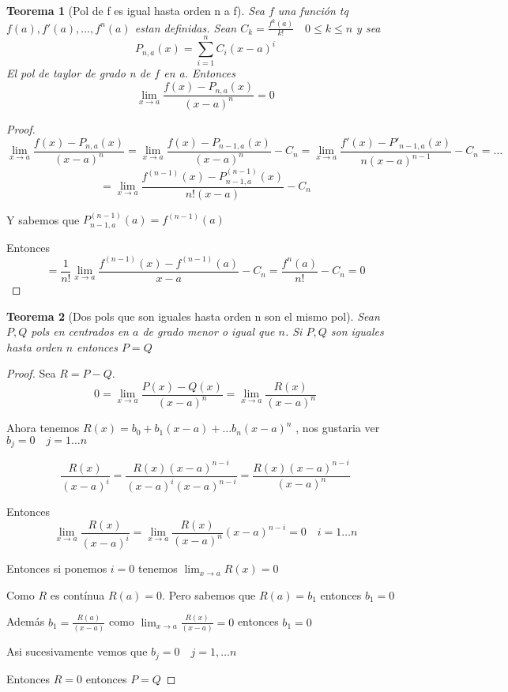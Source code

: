 \documentclass{article}
\theoremstyle{break}
\newtheorem{theorem}{Teorema}[section]
\begin{document}
\begin{theorem}[Pol de f es igual hasta orden n a f]
	Sea $f$ una función tq $f(a),f'(a),\ldots,f^n(a)$ estan definidas. 
	Sean $C_k = \frac{f^k(a)}{k!} \quad 0\leq k\leq n$	y sea 
	\[P_{n,a}(x)= \sum_{i=1}^{n} C_i(x-a)^i\]
	El pol de taylor de grado n de $f$ en a. Entonces 
	\[ \lim_{x \rightarrow a }\frac{f(x)-P_{n,a}(x)}{(x-a)^n}=0 \]
\end{theorem}
\begin{proof}
		\[ \lim_{x \rightarrow a }\frac{f(x)-P_{n,a}(x)}{(x-a)^n}= 
		\lim_{x \rightarrow a }\frac{f(x)-P_{n-1,a}(x)}{(x-a)^n} -C_n = 
		\lim_{x \rightarrow a }\frac{f'(x)-P'_{n-1,a}(x)}{n(x-a)^{n-1}} -C_n= \ldots\]
		\[ =
		 \lim_{x \rightarrow a }\frac{f^{(n-1)}(x)-P^{(n-1)}_{n-1,a}(x)}{n!(x-a)} -C_n\]

		Y sabemos que $P_{n-1,a}^{(n-1)}(a) = f^{(n-1)}(a)$

		Entonces \[ = \frac{1}{n!}\lim_{x \rightarrow a }\frac{f^{(n-1)}(x)-f^{(n-1)}(a)}{x-a} 
		-C_n = \frac{f^n(a)}{n!} - C_n = 0\]
\end{proof}

\begin{theorem}[Dos pols que son iguales hasta orden n son el mismo pol]
	Sean $P,Q$ pols en centrados en $a$ de grado menor o igual que $n$. Si $P,Q$ son iguales
	hasta orden $n$ entonces $P=Q$
\end{theorem}
\begin{proof}
	Sea $R = P - Q$.
	\[ 0 = \lim_{x \rightarrow a }\frac{P(x)-Q(x)}{(x-a)^n} = \lim_{x \rightarrow a }\frac{R(x)}{(x-a)^n} \]

	Ahora tenemos $R(x) = b_0 + b_1 (x-a) + \ldots b_n(x-a)^n$ , 
	nos gustaria ver $b_j = 0 \quad j=1\ldots n$

	\[ \frac{R(x)}{(x-a)^i} = \frac{R(x)(x-a)^{n-i}}{(x-a)^i(x-a)^{n-i}} 
	= \frac{R(x)(x-a)^{n-i}}{(x-a)^n} \]

	Entonces \[ \lim_{x \rightarrow a } \frac{R(x)}{(x-a)^i} = 
	\lim_{x \rightarrow a }\frac{R(x)}{(x-a)^n}(x-a)^{n-i} = 0 \quad i=1\ldots n\]

	Entonces si ponemos $i=0$ tenemos $\lim_{x \rightarrow a }R(x) = 0$

 	Como $R$ es contínua $R(a) = 0$. Pero sabemos que $R(a) = b_1$ entonces $b_1=0$

	Además $b_1 = \frac{R(a)}{(x-a)}$ como $\lim_{x \rightarrow a }\frac{R(x)}{(x-a)} = 0$ entonces 
	$b_1 = 0$

	Asi sucesivamente vemos que $b_j = 0\quad j=1,\ldots n$

	Entonces $R=0$ entonces $P=Q$


\end{proof}
\end{document}
